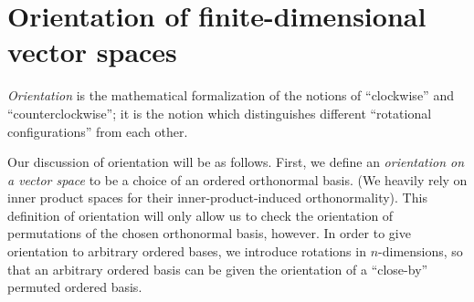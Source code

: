     
    


\newpage

\section{Orientation of finite-dimensional vector spaces}
\label{ch::exterior_pwrs::section::orientation}

\textit{Orientation} is the mathematical formalization of the notions of ``clockwise'' and ``counterclockwise''; it is the notion which distinguishes different ``rotational configurations'' from each other.

Our discussion of orientation will be as follows. First, we define an \textit{orientation on a vector space} to be a choice of an ordered orthonormal basis. (We heavily rely on inner product spaces for their inner-product-induced orthonormality). This definition of orientation will only allow us to check the orientation of permutations of the chosen orthonormal basis, however. In order to give orientation to arbitrary ordered bases, we introduce rotations in $n$-dimensions, so that an arbitrary ordered basis can be given the orientation of a ``close-by'' permuted ordered basis.

